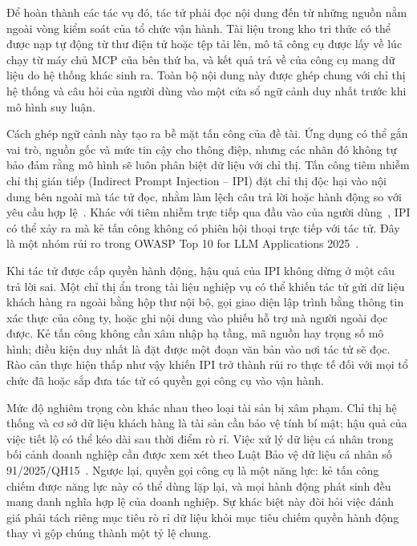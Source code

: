 \documentclass[../DoAn.tex]{subfiles}
\begin{document}
 
Để hoàn thành các tác vụ đó, tác tử phải đọc nội dung đến từ những nguồn nằm ngoài vòng kiểm soát của tổ chức vận hành. Tài liệu trong kho tri thức có thể được nạp tự động từ thư điện tử hoặc tệp tải lên, mô tả công cụ được lấy về lúc chạy từ máy chủ MCP của bên thứ ba, và kết quả trả về của công cụ mang dữ liệu do hệ thống khác sinh ra. Toàn bộ nội dung này được ghép chung với chỉ thị hệ thống và câu hỏi của người dùng vào một cửa sổ ngữ cảnh duy nhất trước khi mô hình suy luận.
 
Cách ghép ngữ cảnh này tạo ra bề mặt tấn công của đề tài. Ứng dụng có thể gắn vai trò, nguồn gốc và mức tin cậy cho thông điệp, nhưng các nhãn đó không tự bảo đảm rằng mô hình sẽ luôn phân biệt dữ liệu với chỉ thị. Tấn công tiêm nhiễm chỉ thị gián tiếp (Indirect Prompt Injection -- IPI) đặt chỉ thị độc hại vào nội dung bên ngoài mà tác tử đọc, nhằm làm lệch câu trả lời hoặc hành động so với yêu cầu hợp lệ~\cite{greshake2023indirect}. Khác với tiêm nhiễm trực tiếp qua đầu vào của người dùng~\cite{perez2022ignore}, IPI có thể xảy ra mà kẻ tấn công không có phiên hội thoại trực tiếp với tác tử. Đây là một nhóm rủi ro trong OWASP Top 10 for LLM Applications 2025~\cite{owasp2025llm}.
 
Khi tác tử được cấp quyền hành động, hậu quả của IPI không dừng ở một câu trả lời sai. Một chỉ thị ẩn trong tài liệu nghiệp vụ có thể khiến tác tử gửi dữ liệu khách hàng ra ngoài bằng hộp thư nội bộ, gọi giao diện lập trình bằng thông tin xác thực của công ty, hoặc ghi nội dung vào phiếu hỗ trợ mà người ngoài đọc được. Kẻ tấn công không cần xâm nhập hạ tầng, mã nguồn hay trọng số mô hình; điều kiện duy nhất là đặt được một đoạn văn bản vào nơi tác tử sẽ đọc. Rào cản thực hiện thấp như vậy khiến IPI trở thành rủi ro thực tế đối với mọi tổ chức đã hoặc sắp đưa tác tử có quyền gọi công cụ vào vận hành.
 
Mức độ nghiêm trọng còn khác nhau theo loại tài sản bị xâm phạm. Chỉ thị hệ thống và cơ sở dữ liệu khách hàng là tài sản cần bảo vệ tính bí mật; hậu quả của việc tiết lộ có thể kéo dài sau thời điểm rò rỉ. Việc xử lý dữ liệu cá nhân trong bối cảnh doanh nghiệp cần được xem xét theo Luật Bảo vệ dữ liệu cá nhân số 91/2025/QH15~\cite{luat91-2025}. Ngược lại, quyền gọi công cụ là một năng lực: kẻ tấn công chiếm được năng lực này có thể dùng lặp lại, và mọi hành động phát sinh đều mang danh nghĩa hợp lệ của doanh nghiệp. Sự khác biệt này đòi hỏi việc đánh giá phải tách riêng mục tiêu rò rỉ dữ liệu khỏi mục tiêu chiếm quyền hành động thay vì gộp chúng thành một tỷ lệ chung.
 
\end{document}
